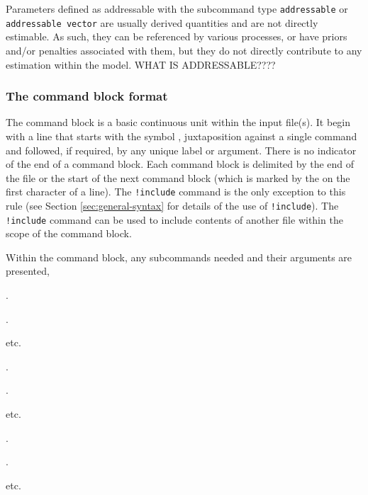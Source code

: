 Parameters defined as addressable with the subcommand type \texttt{addressable} or \texttt{addressable vector} are usually derived quantities and are not directly estimable. As such, they can be referenced by various processes, or have priors and/or penalties associated with them, but they do not directly contribute to any estimation within the model. WHAT IS ADDRESSABLE????

\subsubsection{The command block format}\label{sec:command-block-format}

The command block is a basic continuous unit within the input file(s). It begin with a line that starts with the symbol \command{}, juxtaposition against a single command and followed, if required, by any unique label or argument. There is no indicator of the end of a command block. Each command block is delimited by the end of the file or the start of the next command block (which is marked by the \command{} on the first character of a line). The \texttt{!include} command is the only exception to this rule (see Section \ref{sec:general-syntax} for details of the use of \texttt{!include}). The \texttt{!include} command can be used to include contents of another file within the scope of the command block.

Within the command block, any subcommands needed and their arguments are presented,

\begin{multicols}{3}
	\begin{description}
		\item {}
		\item {} 
		\item {} 
		\item .
		\item .
		\item etc.
		\item {} 
		\item {} 
		\item {} 
		\item .
		\item .
		\item etc.
		\item {} 
		\item {} 
		\item {} 
		\item .
		\item .
		\item etc.
		\end{description}
\end{multicols}

